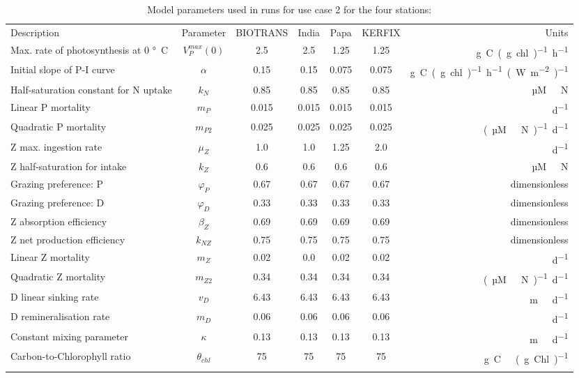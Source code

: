 \documentclass[journal abbreviation, manuscript]{copernicus}
\begin{document}
%
\begin{table}[t]
\caption{Model parameters used in runs for use case 2 for the four stations:}
\begin{tabular}{l c c c c c r}
\tophline
Description & Parameter & BIOTRANS & India & Papa & KERFIX & Units \\
\middlehline

Max. rate of photosynthesis at 0 \unit{\degree C} & $V_P^{max}(0)$ & 2.5 & 2.5 & 1.25 & 1.25 & \unit{g C (g chl)^{-1} h^{-1}}\\
Initial slope of P-I curve & $\alpha$ & 0.15 & 0.15 & 0.075 & 0.075 & \unit{g C (g chl)^{-1} h^{-1} (W m^{-2})^{-1}}\\
Half-saturation constant for N uptake & $k_N$ & 0.85  & 0.85  & 0.85  & 0.85 & \unit{µM \ N} \\
Linear P mortality & $m_P$ & 0.015 & 0.015 & 0.015 & 0.015  & \unit{d^{−1}} \\
Quadratic P mortality & $m_{P2}$ & 0.025 & 0.025 & 0.025 & 0.025 & \unit{(µM \ N)^{-1} d^{−1}} \\
Z max. ingestion rate & $\mu_Z$ & 1.0 & 1.0 & 1.25 & 2.0 & \unit{d^{−1}} \\
Z half-saturation for intake & $k_Z$ & 0.6 & 0.6 & 0.6 & 0.6 & \unit{µM \ N} \\
Grazing preference: P & $\varphi_P$ & 0.67 & 0.67 & 0.67 & 0.67 & dimensionless\\
Grazing preference: D & $\varphi_D$ & 0.33 & 0.33 & 0.33 & 0.33 & dimensionless\\
Z absorption efficiency & $\beta_Z$ & 0.69 & 0.69 & 0.69 & 0.69 & dimensionless\\
Z net production efficiency & $k_{NZ}$ & 0.75 & 0.75 & 0.75 &  0.75 & dimensionless\\
Linear Z mortality & $m_Z$ & 0.02 & 0.0 & 0.02 & 0.02 & \unit{d^{−1}} \\
Quadratic Z mortality & $m_{Z2}$ & 0.34 & 0.34 & 0.34 & 0.34 & \unit{(µM \ N)^{-1} d^{−1}}  \\
D linear sinking rate & $v_D$ & 6.43 & 6.43 & 6.43 & 6.43 & \unit{m \ d^{−1}}\\
D remineralisation rate & $m_D$ & 0.06 & 0.06 & 0.06 & 0.06 & \unit{d^{−1}} \\
Constant mixing parameter & $\kappa$ & 0.13 & 0.13 & 0.13 & 0.13 & \unit{m \ d^{−1}}\\
Carbon-to-Chlorophyll ratio & $\theta_{chl}$ &  75 & 75 & 75 & 75 & \unit{g C \ (g Chl)^{−1}} \\

\bottomhline
\end{tabular}
\label{Table:EMPOWERparams}
\end{table}
%
\end{document}
